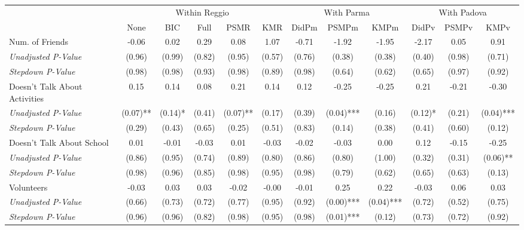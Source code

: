 \begin{tabular}{l c c c c c c c c c c c}
\toprule
& \multicolumn{5}{c}{Within Reggio} & \multicolumn{3}{c}{With Parma} & \multicolumn{3}{c}{With Padova} \\\cmidrule(lr){2-6} \cmidrule(lr){7-9} \cmidrule(lr){10-12}
 & None & BIC & Full & PSMR & KMR & DidPm & PSMPm & KMPm & DidPv & PSMPv & KMPv \\
\midrule
Num. of Friends & -0.06 & 0.02 & 0.29 & 0.08 & 1.07 & -0.71 & -1.92 & -1.95 & -2.17 & 0.05 & 0.91 \\
\quad \textit{Unadjusted P-Value} & (0.96) & (0.99) & (0.82) & (0.95) & (0.57) & (0.76) & (0.38) & (0.38) & (0.40) & (0.98) & (0.71) \\
\quad \textit{Stepdown P-Value} & (0.98) & (0.98) & (0.93) & (0.98) & (0.89) & (0.98) & (0.64) & (0.62) & (0.65) & (0.97) & (0.92) \\
Doesn't Talk About Activities & 0.15 & 0.14 & 0.08 & 0.21 & 0.14 & 0.12 & -0.25 & -0.25 & 0.21 & -0.21 & -0.30 \\
\quad \textit{Unadjusted P-Value} & (0.07)** & (0.14)* & (0.41) & (0.07)** & (0.17) & (0.39) & (0.04)*** & (0.16) & (0.12)* & (0.21) & (0.04)*** \\
\quad \textit{Stepdown P-Value} & (0.29) & (0.43) & (0.65) & (0.25) & (0.51) & (0.83) & (0.14) & (0.38) & (0.41) & (0.60) & (0.12) \\
Doesn't Talk About School & 0.01 & -0.01 & -0.03 & 0.01 & -0.03 & -0.02 & -0.03 & 0.00 & 0.12 & -0.15 & -0.25 \\
\quad \textit{Unadjusted P-Value} & (0.86) & (0.95) & (0.74) & (0.89) & (0.80) & (0.86) & (0.80) & (1.00) & (0.32) & (0.31) & (0.06)** \\
\quad \textit{Stepdown P-Value} & (0.98) & (0.96) & (0.85) & (0.98) & (0.95) & (0.98) & (0.79) & (0.62) & (0.65) & (0.63) & (0.13) \\
Volunteers & -0.03 & 0.03 & 0.03 & -0.02 & -0.00 & -0.01 & 0.25 & 0.22 & -0.03 & 0.06 & 0.03 \\
\quad \textit{Unadjusted P-Value} & (0.66) & (0.73) & (0.72) & (0.77) & (0.95) & (0.92) & (0.00)*** & (0.04)*** & (0.72) & (0.52) & (0.75) \\
\quad \textit{Stepdown P-Value} & (0.96) & (0.96) & (0.82) & (0.98) & (0.95) & (0.98) & (0.01)*** & (0.12) & (0.73) & (0.72) & (0.92) \\
\bottomrule
\end{tabular}

